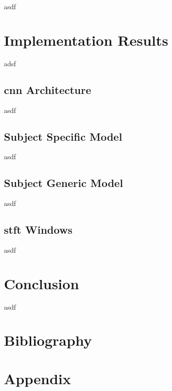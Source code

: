 \documentclass[12pt]{article}
\begin{document}
asdf







\section{Implementation Results}

adsf

\subsection{\acrfull{cnn} Architecture}

asdf

\subsection{Subject Specific Model}

asdf

\subsection{Subject Generic Model}

asdf

\subsection{\acrfull{stft} Windows}

asdf




\section{Conclusion}

asdf

\cite{test}



\pagebreak
\section{Bibliography}


\pagebreak
\section{Appendix}
\end{document}
